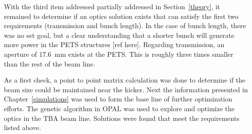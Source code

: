 With the third item addressed partially addressed in Section~\ref{theory}, 
it remained to determine if an optics solution exists that can satisfy the 
first two requirements (transmission and bunch length). 
In the case of bunch length, there was no set goal, but a clear understanding 
that a shorter bunch will generate more power in the PETS structures [ref here].
Regarding transmission, an aperture of \SI{17.6}{mm} exists at the PETS.
This is roughly three times smaller than the rest of the beam line.

As a first check, a point to point matrix calculation was done 
to determine if the beam size could be maintained near the kicker.
Next the information presented in Chapter~\ref{simulations} was used to form the 
base line of further optimization efforts. The genetic algorithm in OPAL
was used to explore and optimize the optics in the TBA beam line.
Solutions were found that meet the requirements listed above.



